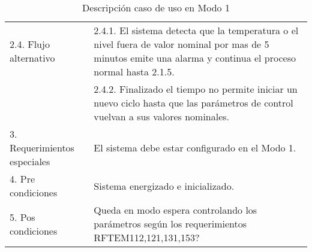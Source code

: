 \begin{table}[h!]
\begin{flushleft}
\begin{tabular}{|m{3cm}|m{11cm}|}
\multicolumn{ 1}{|l|}{2.4. Flujo alternativo } & 2.4.1. El sistema detecta que la temperatura o el nivel fuera de valor nominal por mas de 5 minutos emite una alarma y continua el proceso normal hasta 2.1.5.\\ \cline{ 2- 2}
\multicolumn{ 1}{|l|}{} & 2.4.2.  Finalizado el tiempo no permite iniciar un nuevo ciclo hasta que las parámetros de control vuelvan a sus valores nominales.  \\ \hline
3. Requerimientos especiales & El sistema debe estar configurado en el Modo 1. \\ \hline
4. Pre condiciones  &  Sistema energizado e inicializado.   \\ \hline
5. Pos condiciones &  Queda en modo espera controlando los parámetros según los requerimientos RFTEM112,121,131,153? \\ \hline
\end{tabular}
\end{flushleft}
\caption{Descripción caso de uso en Modo 1}
\label{caso_uso_func_1}
\end{table}


